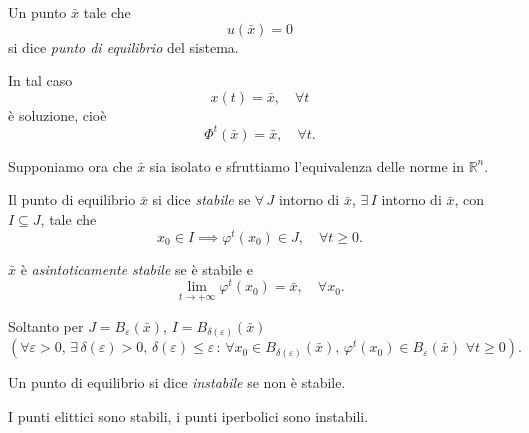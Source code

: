 Un punto $\bar{x}$ tale che
\begin{equation}
    u(\bar{x}) = 0
\end{equation}
si dice \textit{punto di equilibrio} del sistema.

In tal caso
\begin{equation}
    x(t) = \bar{x}, \quad \forall t
\end{equation}
è soluzione, cioè
\begin{equation}
    \Phi^t(\bar{x}) = \bar{x}, \quad \forall t.
\end{equation}

Supponiamo ora che $\bar{x}$ sia isolato e sfruttiamo l’equivalenza delle norme in $\mathbb{R}^n$.

\begin{definition}
Il punto di equilibrio $\bar{x}$ si dice \textit{stabile} se $\forall \, J$ intorno di $\bar{x}$, 
$\exists \, I$ intorno di $\bar{x}$, con $I \subseteq J$, tale che
\[
x_0 \in I \implies \varphi^t(x_0) \in J, \quad \forall t \geq 0.
\]
\end{definition}

\begin{definition}
$\bar{x}$ è \textit{asintoticamente stabile} se è stabile e 
\[
\lim_{t \to +\infty} \varphi^t(x_0) = \bar{x}, \quad \forall x_0.
\]
\end{definition}

\begin{remark}
Soltanto per $J = B_\varepsilon(\bar{x})$, $I = B_{\delta(\varepsilon)}(\bar{x})$ 
\[
(\forall \varepsilon > 0, \, \exists \, \delta(\varepsilon) > 0, \, \delta(\varepsilon) \leq \varepsilon \, : \, 
\forall x_0 \in B_{\delta(\varepsilon)}(\bar{x}), \, \varphi^t(x_0) \in B_\varepsilon(\bar{x}) \,\, \forall t \geq 0).
\]
\end{remark}
\begin{definition}
    Un punto di equilibrio si dice \textit{instabile} se non è stabile.
\end{definition}
\begin{example}
    I punti elittici sono stabili, i punti iperbolici sono instabili.
\end{example}

